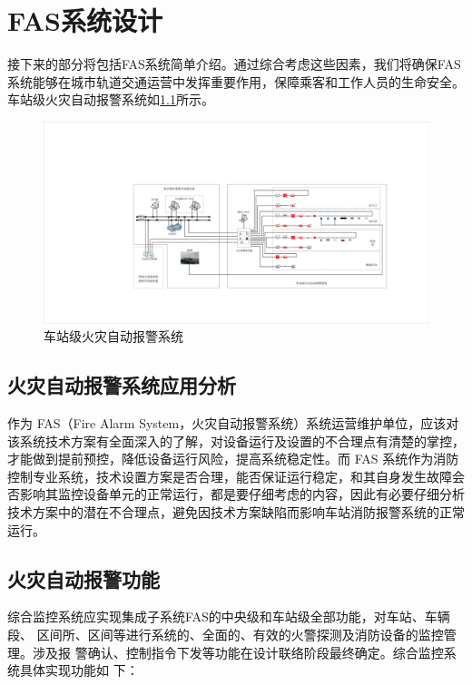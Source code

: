 \chapter{FAS系统设计}
接下来的部分将包括FAS系统简单介绍。通过综合考虑这些因素，我们将确保FAS系统能够在城市轨道交通运营中发挥重要作用，保障乘客和工作人员的生命安全。车站级火灾自动报警系统如\ref{fig:车站级火灾自动报警系统}所示。
\begin{figure}[h]
	\centering
	\includegraphics[width=0.8\linewidth]{figures/车站级火灾自动报警系统}
	\caption{车站级火灾自动报警系统}
	\label{fig:车站级火灾自动报警系统}
\end{figure}

\section{火灾自动报警系统应用分析}
作为 FAS（Fire Alarm System，火灾自动报警系统）系统运营维护单位，应该对该系统技术方案有全面深入的了解，对设备运行及设置的不合理点有清楚的掌控，才能做到提前预控，降低设备运行风险，提高系统稳定性。而 FAS 系统作为消防控制专业系统，技术设置方案是否合理，能否保证运行稳定，和其自身发生故障会否影响其监控设备单元的正常运行，都是要仔细考虑的内容，因此有必要仔细分析技术方案中的潜在不合理点，避免因技术方案缺陷而影响车站消防报警系统的正常运行。
\section{火灾自动报警功能}
综合监控系统应实现集成子系统FAS的中央级和车站级全部功能，对车站、车辆段、 区间所、区间等进行系统的、全面的、有效的火警探测及消防设备的监控管理。涉及报 警确认、控制指令下发等功能在设计联络阶段最终确定。综合监控系统具体实现功能如 下：

